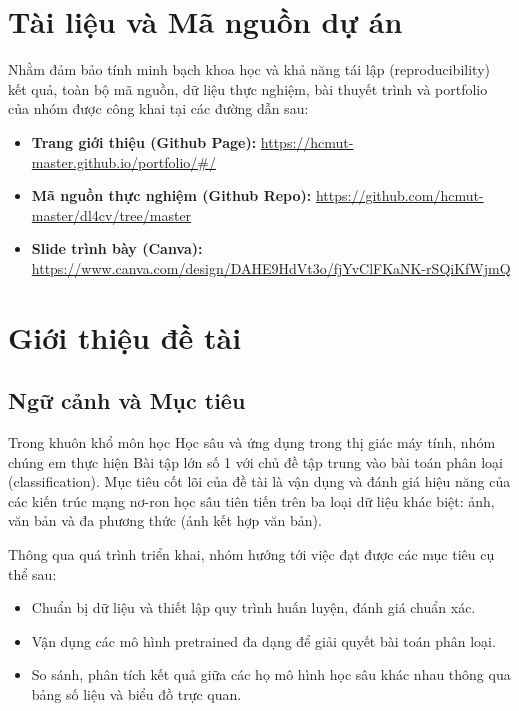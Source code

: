 \documentclass[a4paper]{article}
\theoremstyle{definition}
\begin{document}

\newpage
\tableofcontents
\newpage

\section*{Tài liệu và Mã nguồn dự án}
Nhằm đảm bảo tính minh bạch khoa học và khả năng tái lập (reproducibility) kết quả, toàn bộ mã nguồn, dữ liệu thực nghiệm, bài thuyết trình và portfolio của nhóm được công khai tại các đường dẫn sau:
\begin{itemize}
	\item \textbf{Trang giới thiệu (Github Page):} \url{https://hcmut-master.github.io/portfolio/#/}
	\item \textbf{Mã nguồn thực nghiệm (Github Repo):} \url{https://github.com/hcmut-master/dl4cv/tree/master}
	\item \textbf{Slide trình bày (Canva):} \url{https://www.canva.com/design/DAHE9HdVt3o/fjYvClFKaNK-rSQiKfWjmQ}
\end{itemize}

\vspace{0.5cm}

\section{Giới thiệu đề tài}

\subsection{Ngữ cảnh và Mục tiêu}
Trong khuôn khổ môn học Học sâu và ứng dụng trong thị giác máy tính, nhóm chúng em thực hiện Bài tập lớn số 1 với chủ đề tập trung vào bài toán phân loại (classification). Mục tiêu cốt lõi của đề tài là vận dụng và đánh giá hiệu năng của các kiến trúc mạng nơ-ron học sâu tiên tiến trên ba loại dữ liệu khác biệt: ảnh, văn bản và đa phương thức (ảnh kết hợp văn bản).

Thông qua quá trình triển khai, nhóm hướng tới việc đạt được các mục tiêu cụ thể sau:
\begin{itemize}
	\item Chuẩn bị dữ liệu và thiết lập quy trình huấn luyện, đánh giá chuẩn xác.
	\item Vận dụng các mô hình pretrained đa dạng để giải quyết bài toán phân loại.
	\item So sánh, phân tích kết quả giữa các họ mô hình học sâu khác nhau thông qua bảng số liệu và biểu đồ trực quan.
\end{itemize}
\end{document}
